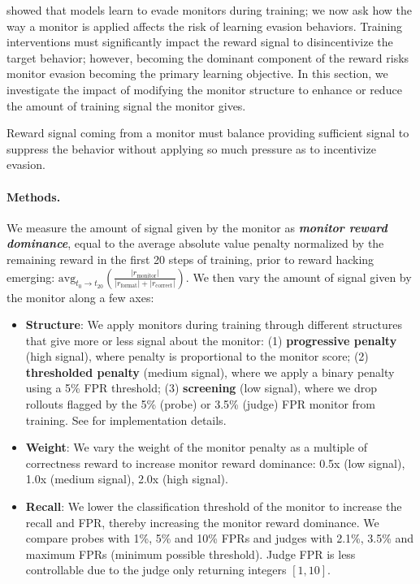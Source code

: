 \documentclass{article}
\begin{document}
 showed that models learn to evade monitors during training; we now ask how the way a monitor is applied affects the risk of learning evasion behaviors. Training interventions must significantly impact the reward signal to disincentivize the target behavior; however, becoming the dominant component of the reward risks monitor evasion becoming the primary learning objective. In this section, we investigate the impact of modifying the monitor structure to enhance or reduce the amount of training signal the monitor gives. 

\begin{takeawaybox}
    Reward signal coming from a monitor must balance providing sufficient signal to suppress the behavior without applying so much pressure as to incentivize evasion. 
\end{takeawaybox}

\paragraph{Methods.} We measure the amount of signal given by the monitor as \textbf{\emph{monitor reward dominance}}, equal to the average absolute value penalty normalized by the remaining reward in the first 20 steps of training, prior to reward hacking emerging: $\text{avg}_{t_0\rightarrow t_{20}}(\frac{| r_{\text{monitor}}|}{|r_{\text{format}}|+|r_{\text{correct}}|})$. We then vary the amount of signal given by the monitor along a few axes: 
\begin{itemize}[leftmargin=*]
    \item \textbf{Structure}: We apply monitors during training through different structures that give more or less signal about the monitor: (1) \textbf{progressive penalty} (high signal), where penalty is proportional to the monitor score; (2) \textbf{thresholded penalty} (medium signal), where we apply a binary penalty using a 5\% FPR threshold; (3) \textbf{screening} (low signal), where we drop rollouts flagged by the 5\% (probe) or 3.5\% (judge) FPR monitor from training. See  for implementation details.
    \item \textbf{Weight}: We vary the weight of the monitor penalty as a multiple of correctness reward to increase monitor reward dominance: 0.5x (low signal), 1.0x (medium signal), 2.0x (high signal). 
    \item \textbf{Recall}: We lower the classification threshold of the monitor to increase the recall and FPR, thereby increasing the monitor reward dominance. We compare probes with 1\%, 5\% and 10\% FPRs and judges with 2.1\%, 3.5\% and maximum FPRs (minimum possible threshold). Judge FPR is less controllable due to the judge only returning integers $[1,10]$.
\end{itemize}
\end{document}

